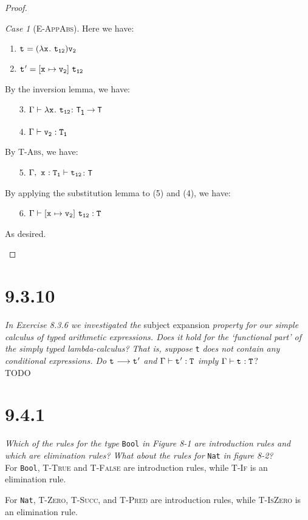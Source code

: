 \documentclass{article}
\newcommand{\term}[1]{\texttt{t\textsubscript{#1}}}
\newcommand{\val}[1]{\texttt{v\textsubscript{#1}}}
\newcommand{\ty}[1]{\texttt{T\textsubscript{#1}}}
\newcommand{\var}[1]{\texttt{x\textsubscript{#1}}}
\newcommand{\fn}[2]{#1$\rightarrow$#2}
\renewcommand{\ss}[2]{#1 \longrightarrow #2}
\theoremstyle{remark}
\newtheorem*{case}{Case}
\begin{document}
\begin{proof}
        \begin{case}[\textsc{E-AppAbs}]
            Here we have:
            \begin{enumerate}
                \item $\term{} = (\lambda \var{}.\ \term{12}) \val{2}$
                \item $\term{}' = [\var{} \mapsto \val{2}]\ \term{12}$
            \end{enumerate}
            By the inversion lemma, we have:
            \begin{enumerate}
                \item[3.] $\Gamma \vdash \lambda \var{}.\ \term{12}$: \fn{\ty{1}}{\ty{}}
                \item[4.] $\Gamma \vdash \val{2}: \ty{1}$
            \end{enumerate}
            By \textsc{T-Abs}, we have:
            \begin{enumerate}
                \item[5.] $\Gamma,\ \var{}:\ty{1} \vdash \term{12}$: \ty{}
            \end{enumerate}
            By applying the substitution lemma to (5) and (4), we have:
            \begin{enumerate}
                \item[6.] $\Gamma \vdash [\var{} \mapsto \val{2}]\ \term{12} : \ty{}$ 
            \end{enumerate}
            As desired.
        \end{case}
    \end{proof}

\section{9.3.10}

    \textit{In Exercise 8.3.6 we investigated the} subject expansion \textit{property for our simple calculus}
    \textit{of typed arithmetic expressions. Does it hold for the `functional part' of the simply typed lambda-calculus?}
    \textit{That is, suppose} \term{} \textit{does not contain any conditional expressions. Do} $\ss{\term{}}{\term{}'}$
    \textit{and} $\Gamma \vdash \term{}' : \ty{}$ \textit{imply} $\Gamma \vdash \term{} : \ty{}$? \\

    TODO

\section{9.4.1}

    \textit{Which of the rules for the type} \texttt{Bool} \textit{in Figure 8-1 are introduction rules and}
    \textit{which are elimination rules? What about the rules for} \texttt{Nat} \textit{in figure 8-2?} \\

    For \texttt{Bool}, \textsc{T-True} and \textsc{T-False} are introduction rules,
    while \textsc{T-If} is an elimination rule.

    For \texttt{Nat}, \textsc{T-Zero}, \textsc{T-Succ}, and \textsc{T-Pred} are introduction rules,
    while \textsc{T-IsZero} is an elimination rule.
\end{document}
